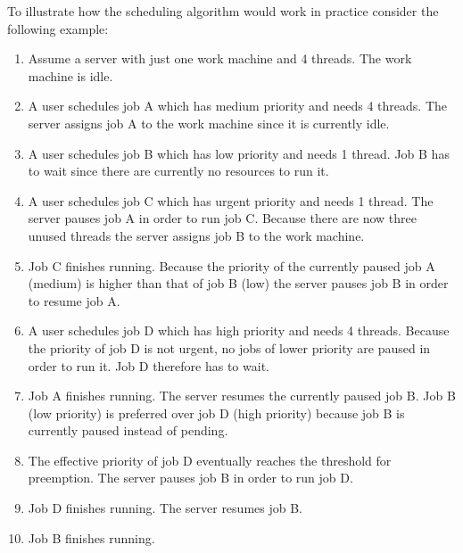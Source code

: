 To illustrate how the scheduling algorithm would work in practice consider the following example:
\begin{enumerate}
  \item Assume a server with just one work machine and 4 threads.
  The work machine is idle.
  \item A user schedules job A which has medium priority and needs 4 threads.
  The server assigns job A to the work machine since it is currently idle.
  \item A user schedules job B which has low priority and needs 1 thread.
  Job B has to wait since there are currently no resources to run it.
  \item A user schedules job C which has urgent priority and needs 1 thread.
  The server pauses job A in order to run job C.
  Because there are now three unused threads the server assigns job B to the work machine.
  \item Job C finishes running.
  Because the priority of the currently paused job A (medium) is higher than that of job B (low) the server pauses job B in order to resume job A.
  \item A user schedules job D which has high priority and needs 4 threads.
  Because the priority of job D is not urgent, no jobs of lower priority are paused in order to run it.
  Job D therefore has to wait.
  \item Job A finishes running.
  The server resumes the currently paused job B.
  Job B (low priority) is preferred over job D (high priority) because job B is currently paused instead of pending.
  \item The effective priority of job D eventually reaches the threshold for preemption.
  The server pauses job B in order to run job D.
  \item Job D finishes running.
  The server resumes job B.
  \item Job B finishes running.
\end{enumerate}
